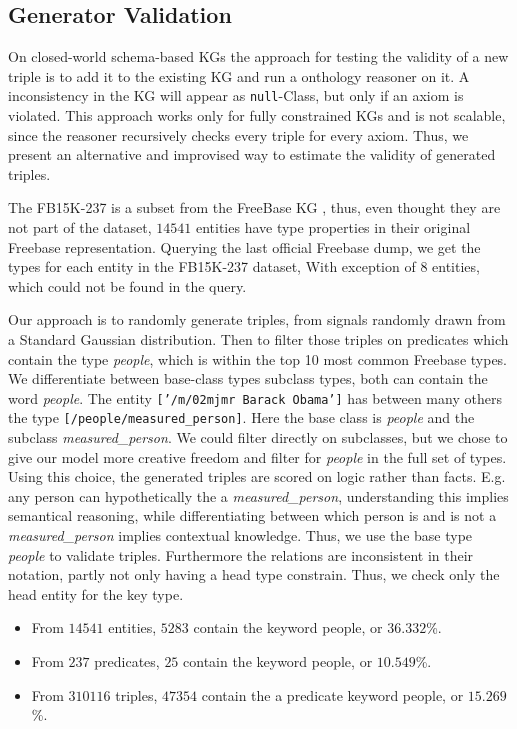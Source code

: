 \subsection{Generator Validation}
\label{ssec5:syntax}

On closed-world schema-based KGs the approach for testing the validity of a new triple is to add it to the existing KG and run a onthology reasoner on it. A inconsistency in the KG will appear as \texttt{null}-Class, but only if an axiom is violated. This approach works only for fully constrained KGs and is not scalable, since the reasoner recursively checks every triple for every axiom. Thus, we present an alternative and improvised way to estimate the validity of generated triples.

The FB15K-237 is a subset from the FreeBase KG \cite{bollacker_freebase_2008}, thus, even thought they are not part of the dataset, $14541$ entities have type properties in their original Freebase representation. 
Querying the last official Freebase dump, we get the types for each entity in the FB15K-237 dataset, With exception of $8$ entities, which could not be found in the query.

Our approach is to randomly generate triples, from signals randomly drawn from a Standard Gaussian distribution. Then to filter those triples on predicates which contain the type \textit{people}, which is within the top 10 most common Freebase types. We differentiate between base-class types subclass types, both can contain the word \textit{people}. The entity \texttt{['/m/02mjmr Barack Obama']} has between many others the type \texttt{[/people/measured\_person]}. Here the base class is \textit{people} and the subclass \textit{measured\_person}. We could filter directly on subclasses, but we chose to give our model more creative freedom and filter for \textit{people} in the full set of types. Using this choice, the generated triples are scored on logic rather than facts. E.g. any person can hypothetically the a \textit{measured\_person}, understanding this implies semantical reasoning, while differentiating between which person is and is not a \textit{measured\_person} implies contextual knowledge. Thus, we use the base type \textit{people} to validate triples.
Furthermore the relations are inconsistent in their notation, partly not only having a head type constrain. Thus, we check only the head entity for the key type. 

\begin{itemize}
  \item From $14541$ entities, $5283$ contain the keyword people, or $36.332$\%.
  \item From $237$ predicates, $25$ contain the keyword people, or $10.549$\%.
  \item From $310116$ triples, $47354$ contain the a predicate keyword people, or $15.269$\%.
\end{itemize}

